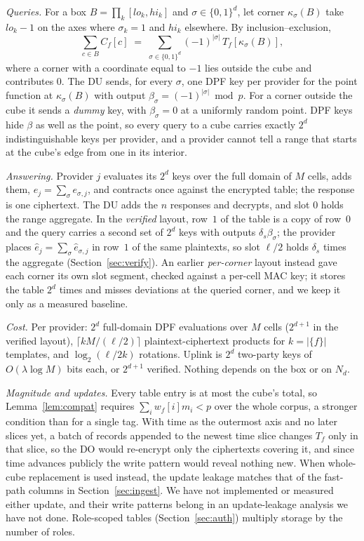 \documentclass[a4paper,fleqn]{cas-sc}
\begin{document}
\emph{Queries.} For a box $B=\prod_k[\mathit{lo}_k,\mathit{hi}_k]$ and
$\sigma\in\{0,1\}^d$, let corner $\kappa_\sigma(B)$ take $\mathit{lo}_k-1$ on
the axes where $\sigma_k=1$ and $\mathit{hi}_k$ elsewhere. By
inclusion--exclusion,
\begin{equation}
\label{eq:ie}
\sum_{c\in B} C_f[c] \;=\; \sum_{\sigma\in\{0,1\}^d} (-1)^{|\sigma|}\,
T_f[\kappa_\sigma(B)],
\end{equation}
where a corner with a coordinate equal to $-1$ lies outside the cube and
contributes $0$. The DU sends, for every $\sigma$, one DPF key per provider
for the point function at $\kappa_\sigma(B)$ with output
$\beta_\sigma=(-1)^{|\sigma|}\bmod p$. For a corner outside the cube it sends a
\emph{dummy} key, with $\beta_\sigma=0$ at a uniformly random point. DPF keys
hide $\beta$ as well as the point, so every query to a cube carries exactly
$2^d$ indistinguishable keys per provider, and a provider cannot tell a range
that starts at the cube's edge from one in its interior.

\emph{Answering.} Provider $j$ evaluates its $2^d$ keys over the full domain of
$M$ cells, adds them, $e_j=\sum_\sigma e_{\sigma,j}$, and contracts once against
the encrypted table; the response is one ciphertext. The DU adds the $n$
responses and decrypts, and slot $0$ holds the range aggregate. In the
\emph{verified} layout, row~$1$ of the table is a copy of row~$0$ and the query
carries a second set of $2^d$ keys with outputs $\delta_s\beta_\sigma$; the
provider places $\hat e_j=\sum_\sigma\hat e_{\sigma,j}$ in row~$1$ of the same
plaintexts, so slot $\ell/2$ holds $\delta_s$ times the aggregate
(Section~\ref{sec:verify}). An earlier \emph{per-corner} layout instead gave
each corner its own slot segment, checked against a per-cell MAC key; it stores
the table $2^d$ times and misses deviations at the queried corner, and we keep
it only as a measured baseline.

\emph{Cost.} Per provider: $2^d$ full-domain DPF evaluations over $M$ cells
($2^{d+1}$ in the verified layout), $\lceil kM/(\ell/2)\rceil$
plaintext-ciphertext products for $k=|\{f\}|$ templates, and
$\log_2(\ell/2k)$ rotations. Uplink is $2^d$ two-party keys of
$O(\lambda\log M)$ bits each, or $2^{d+1}$ verified. Nothing depends on the box
or on $N_d$.

\emph{Magnitude and updates.} Every table entry is at most the cube's total,
so Lemma~\ref{lem:compat} requires $\sum_i w_f[i]m_i<p$ over the whole corpus,
a stronger condition than for a single tag. With time as the outermost axis
and no later slices yet, a batch of records appended to the newest time slice
changes $T_f$ only in that slice, so the DO would re-encrypt only the
ciphertexts covering it, and since time advances publicly the write pattern
would reveal nothing new. When whole-cube replacement is used instead, the
update leakage matches that of the fast-path columns in
Section~\ref{sec:ingest}. We have not implemented or measured either update,
and their write patterns belong in an update-leakage analysis we have not done.
Role-scoped tables (Section~\ref{sec:auth}) multiply storage by the number of
roles.
\end{document}
